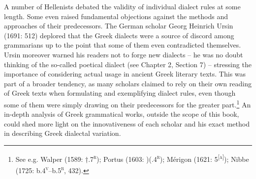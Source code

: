 \documentclass[12pt]{article}
\newenvironment{styleStandard}{\renewcommand\baselinestretch{1.25}\setlength\leftskip{0in}\setlength\rightskip{0in}\setlength\parindent{0.1972in}\setlength\parfillskip{0pt plus 1fil}\setlength\parskip{0in plus 1pt}\writerlistparindent\writerlistleftskip\leavevmode\normalfont\normalsize\writerlistlabel\ignorespaces}{\unskip\vspace{0in plus 1pt}\par}
\newcommand\writerlistleftskip{}
\newcommand\writerlistparindent{}
\newcommand\writerlistlabel{}
\begin{document}
\begin{styleStandard}
A number of Hellenists debated the validity of individual dialect rules at some length. Some even raised fundamental objections against the methods and approaches of their predecessors. The German scholar Georg Heinrich Ursin (1691: 512) deplored that the Greek dialects were a source of discord among grammarians up to the point that some of them even contradicted themselves. Ursin moreover warned his readers not to forge new dialects – he was no doubt thinking of the so-called poetical dialect (see Chapter 2, Section 7) – stressing the importance of considering actual usage in ancient Greek literary texts. This was part of a broader tendency, as many scholars claimed to rely on their own reading of Greek texts when formulating and exemplifying dialect rules, even though some of them were simply drawing on their predecessors for the greater part.\footnote{\textrm{ See e.g. Walper (1589: †.7}\textrm{\textsc{\textsuperscript{r}}}\textrm{); Portus (1603: )(.4}\textrm{\textsc{\textsuperscript{r}}}\textrm{); Mérigon (1621: 5}\textrm{\textsc{\textsuperscript{[a]}}}\textrm{); Nibbe (1725: b.4}\textrm{\textsc{\textsuperscript{v}}}\textrm{–b.5}\textrm{\textsc{\textsuperscript{r}}}\textrm{, 432).}} An in-depth analysis of Greek grammatical works, outside the scope of this book, could shed more light on the innovativeness of each scholar and his exact method in describing Greek dialectal variation.
\end{styleStandard}
\end{document}
